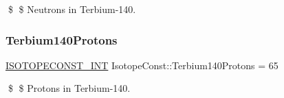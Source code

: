 \$ \$ Neutrons in Terbium-\/140. \mbox{\label{group___isotope_const-_terbium-_tb140_gae20ccccccc392ab9d4d0efbca1ad7dfa}} 
\subsubsection{\texorpdfstring{Terbium140\+Protons}{Terbium140Protons}}
{\footnotesize\ttfamily \mbox{\hyperlink{group___isotope_const-_macros_ga5f18360b3e99483a35c32d789e62621c}{I\+S\+O\+T\+O\+P\+E\+C\+O\+N\+S\+T\+\_\+\+I\+NT}} Isotope\+Const\+::\+Terbium140\+Protons = 65}

\$ \$ Protons in Terbium-\/140. 